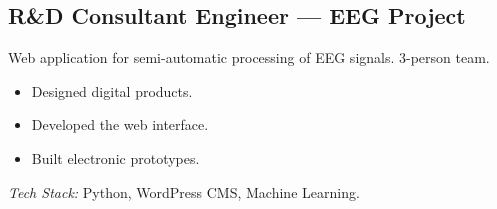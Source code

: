 \documentclass[10pt,a4paper]{article}
\begin{document}
\vspace{4pt}

\subsection*{R\&D Consultant Engineer --- EEG Project}
\color{darkgray}
Web application for semi-automatic processing of EEG signals. 3-person team.
\begin{itemize}
  \item Designed digital products.
  \item Developed the web interface.
  \item Built electronic prototypes.
\end{itemize}
\textit{Tech Stack:} Python, WordPress CMS, Machine Learning.

\vspace{14pt}
\end{document}
